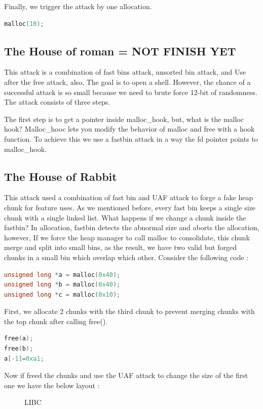 \documentclass{masterthesis}
\begin{document}
Finally, we trigger the attack by one allocation. 
\begin{lstlisting}[language=c,frame=tlrb]
 malloc(10);
\end{lstlisting}

\subsection{The House of roman = NOT FINISH YET}
This attack is a combination of fast bins attack, unsorted bin attack, and Use after the free attack, also, The goal is to open a shell. However, the chance of a successful attack is so small because we need to brute force 12-bit of randomness. The attack consists of three steps.

The first step is to get a pointer inside malloc\_hook, but, what is the malloc hook? Malloc\_hooc lets you modify the behavior of malloc and free with a hook function. To achieve this we use a fastbin attack in a way the fd pointer points to malloc\_hook.

\subsection{The House of Rabbit}

This attack used a combination of fast bin and UAF attack to forge a fake heap chunk for feature uses. As we mentioned before, every fast bin keeps a single size chunk with a single linked list. What happens if we change a chunk inside the fastbin? In allocation, fastbin detects the abnormal size and aborts the allocation, however, If we force the heap manager to call malloc to consolidate, this chunk merge and split into small bins, as the result, we have two valid but forged chunks in a small bin which overlap which other. Consider the following code : 
\begin{lstlisting}[language=c,frame=tlrb]
unsigned long *a = malloc(0x40);
unsigned long *b = malloc(0x40);
unsigned long *c = malloc(0x10);
\end{lstlisting}

First, we allocate 2 chunks with the third chunk to prevent merging chunks with the top chunk after calling free(). 

\begin{lstlisting}[language=c,frame=tlrb]
free(a);
free(b);
a[-1]=0xa1;
\end{lstlisting}
Now if freed the chunks and use the UAF attack to change the size of the first one we have the below layout :
\begin{figure}[h!]
  \caption{LIBC}
\end{figure}
\end{document}

